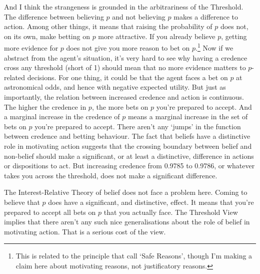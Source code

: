And I think the strangeness is grounded in the arbitrariness of the Threshold. The difference between believing \(p\) and not believing \(p\) makes a difference to action. Among other things, it means that raising the probability of \(p\) does not, on its own, make betting on \(p\) more attractive. If you already believe \(p\), getting more evidence for \(p\) does not give you more reason to bet on \(p\).\footnote{This is related to the principle that \cite{FantlMcGrath2009} call `Safe Reasons', though I'm making a claim here about motivating reasons, not justificatory reasons.} Now if we abstract from the agent's situation, it's very hard to see why having a credence cross any threshold (short of 1) should mean that no more evidence matters to \(p\)-related decisions. For one thing, it could be that the agent faces a bet on \(p\) at astronomical odds, and hence with negative expected utility. But just as importantly, the relation between increased credence and action is continuous. The higher the credence in \(p\), the more bets on \(p\) you're prepared to accept. And a marginal increase in the credence of \(p\) means a marginal increase in the set of bets on \(p\) you're prepared to accept. There aren't any `jumps' in the function between credence and betting behaviour. The fact that beliefs have a distinctive role in motivating action suggests that the crossing boundary between belief and non-belief should make a significant, or at least a distinctive, difference in actions or dispositions to act. But increasing credence from 0.9785 to 0.9786, or whatever takes you across the threshold, does not make a significant difference.

The Interest-Relative Theory of belief does not face a problem here. Coming to believe that \(p\) does have a significant, and distinctive, effect. It means that you're prepared to accept all bets on \(p\) that you actually face. The Threshold View implies that there aren't any such nice generalisations about the role of belief in motivating action. That is a serious cost of the view.







